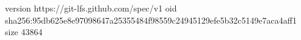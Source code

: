 version https://git-lfs.github.com/spec/v1
oid sha256:95db625e8e97098647a25355484f98559c24945129efe5b32c5149e7aca4aff1
size 43864
